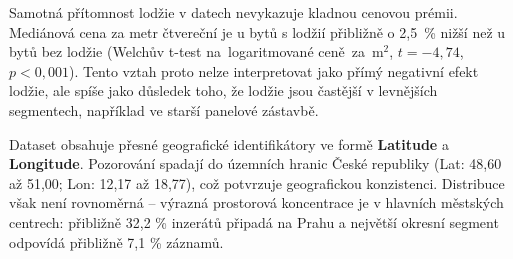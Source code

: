 Samotná přítomnost lodžie v datech nevykazuje kladnou cenovou prémii. Mediánová cena za metr čtvereční je u bytů s lodžií přibližně o 2{,}5~\% nižší než u bytů bez lodžie (Welchův t-test na~logaritmované ceně~za~$\mathrm{m}^2$, $t = -4{,}74$, $p < 0{,}001$). Tento vztah proto nelze interpretovat jako přímý negativní efekt lodžie, ale spíše jako důsledek toho, že lodžie jsou častější v levnějších segmentech, například ve starší panelové zástavbě.

Dataset obsahuje přesné geografické identifikátory ve formě \textbf{Latitude} a \textbf{Longitude}. Pozorování spadají do územních hranic České republiky (Lat: 48{,}60 až 51{,}00; Lon: 12{,}17 až 18{,}77), což potvrzuje geografickou konzistenci. Distribuce však není rovnoměrná -- výrazná prostorová koncentrace je v hlavních městských centrech: přibližně 32{,}2 \% inzerátů připadá na Prahu a největší okresní segment odpovídá přibližně 7{,}1 \% záznamů.

